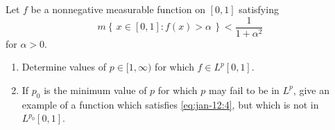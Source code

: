 \begin{problem}
  Let \(f\) be a nonnegative measurable function on \([0,1]\) satisfying
  \[
    \label{eq:jan-12:4}%
    \tag{\(\blacklozenge\)}%
    m\left\{\,x\in[0,1]:f(x)>\alpha\,\right\}<\frac{1}{1+\alpha^2}
  \]
  for \(\alpha>0\).
  \begin{enumerate}[label=(\alph*),noitemsep]
  \item Determine values of \(p\in[1,\infty)\) for which \(f\in L^p[0,1]\).
  \item If \(p_0\) is the minimum value of \(p\) for which \(p\) may fail
    to be in \(L^p\), give an example of a function which satisfies
    \eqref{eq:jan-12:4}, but which is not in \(L^{p_0}[0,1]\).
\end{enumerate}
\end{problem}
\begin{solution}
\end{solution}


